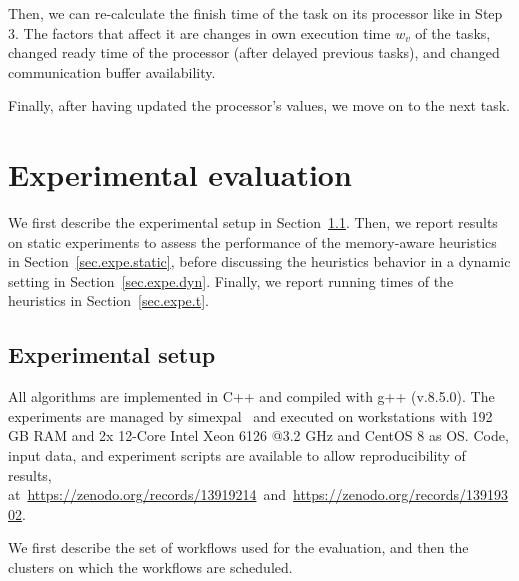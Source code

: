 \documentclass[conference]{IEEEtran}
\newcommand{\skug}[1]{{\color{blue}[SK: #1]}}
\newcommand{\hmey}[1]{{\color{red}[HM: #1]}}
\begin{document}
    Then, we can re-calculate the finish time of the task on its processor like in Step 3.
    The factors that affect it are changes in own execution time $w_v$ of the tasks, changed ready time of the processor
    (after delayed previous tasks), and changed communication buffer availability.

    Finally, after having updated the processor's values, we move on to the next task.





\section{Experimental evaluation} %
\label{sec:expe}

We first describe the experimental setup in Section~\ref{sec:setup}. 
Then, we report results on static experiments to assess the performance
of the memory-aware heuristics in Section~\ref{sec.expe.static}, before
discussing the heuristics behavior in a dynamic setting in Section~\ref{sec.expe.dyn}. 
Finally, we report running times of the heuristics in Section~\ref{sec.expe.t}. 

\subsection{Experimental setup} %
    \label{sec:setup}

    All algorithms are implemented in C++ and compiled with g++ (v.8.5.0).
    The experiments are managed by simexpal~\cite{DBLP:journals/algorithms/AngrimanGLMNPT19} and executed on workstations with 192 GB RAM and 2x 12-Core Intel Xeon 6126 @3.2 GHz
    and CentOS 8 as OS.
    Code, input data, and experiment scripts are available to allow reproducibility of results, at~\url{https://zenodo.org/records/13919214}~and~\url{https://zenodo.org/records/13919302}.

    We first describe the set of workflows used for the evaluation, and then the clusters on which the
    workflows are scheduled.
\end{document}
